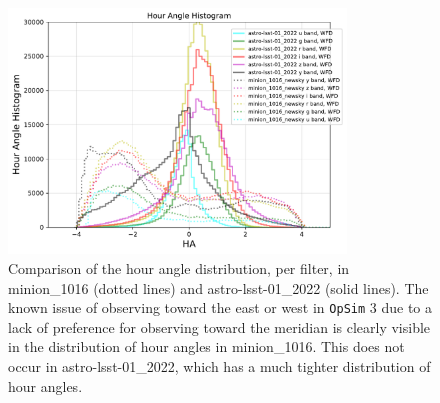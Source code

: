 \documentclass[DM,authoryear,toc]{lsstdoc}
\newcommand{\opsim}{\texttt{OpSim}\xspace}
\begin{document}
\begin{figure}[ht]
\centering
\includegraphics[width=0.8\textwidth]{figures/hour_angle_comparison}
\caption{Comparison of the hour angle distribution, per filter, in minion\_1016 (dotted lines) and astro-lsst-01\_2022 (solid lines). The known issue of observing toward the east 
or west in \opsim 3 due to a lack of preference for observing toward the meridian is clearly visible in the distribution of hour angles in minion\_1016. This does not occur in astro-lsst-01\_2022, which has a much tighter distribution of hour angles.
\label{fig:hour_angle_comparison}}
\end{figure}
\end{document}
